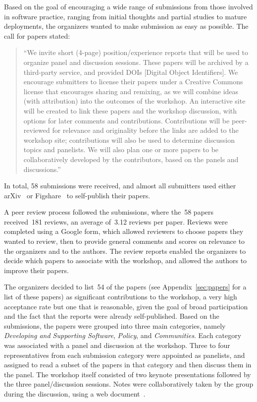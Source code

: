\documentclass[11pt, oneside]{amsart}
\begin{document}
Based on the goal of encouraging a wide range of submissions from
those involved in software practice, ranging from initial thoughts and
partial studies to mature deployments, the organizers wanted to make
submission as easy as possible. The call for papers stated:

\begin{quote}
``We invite short (4-page) position/experience reports that will be used
to organize panel and discussion sessions. These papers will be
archived by a third-party service, and provided DOIs [Digital Object Identifiers].
We encourage
submitters to license their papers under a Creative Commons license
that encourages sharing and remixing, as we will combine ideas (with
attribution) into the outcomes of the workshop.  An interactive site
will be created to link these papers and the workshop discussion, with
options for later comments and contributions. Contributions will be
peer-reviewed for relevance and originality before the links are added
to the workshop site; contributions will also be used to determine
discussion topics and panelists. We will also plan one or more papers
to be collaboratively developed by the contributors, based on the
panels and discussions.''
\end{quote}

In total, 58 submissions were received, and almost all submitters used either
arXiv~\cite{arXiv-web} or Figshare~\cite{figshare-web} to self-publish
their papers.

A peer review process followed the submissions, where
the~58 papers received~181 reviews, an average of~3.12 reviews per
paper. Reviews were completed using a Google form, which allowed
reviewers to choose papers they wanted to review, then to provide
general comments and scores on relevance to the organizers and
to the authors. The review reports enabled the organizers to decide
which papers to associate with the workshop, and allowed the authors
to improve their papers.

The organizers decided to list~54 of the papers (see Appendix~\ref{sec:papers} for a list of these papers) as significant
contributions to the workshop, a very high acceptance rate but one
that is reasonable, given the goal of broad participation and the fact
that the reports were already self-published. Based on the submissions, the papers were
grouped into three main categories, namely \emph{Developing and
Supporting Software}, \emph{Policy}, and \emph{Communities}. Each
category was associated with a panel and discussion at the
workshop.  Three to four representatives from each submission
category were appointed as panelists, and assigned to read a subset of
the papers in that category and then discuss them in the panel.
The workshop itself consisted of two keynote presentations followed by the
three panel/discussion sessions.  Notes were collaboratively taken
by the group during the discussion, using a web document~\cite{WSSSPE1-google-notes}.
\end{document}

